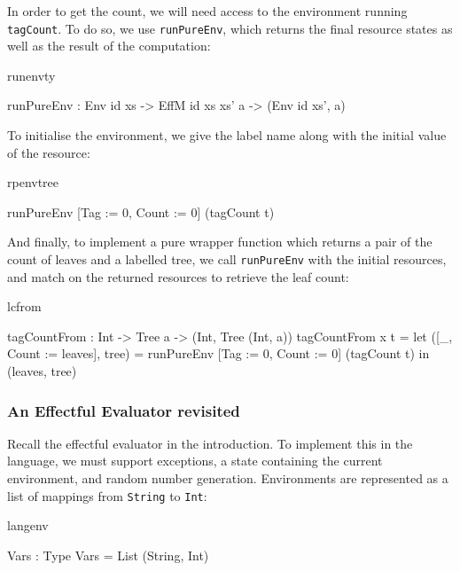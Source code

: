 

\noindent
In order to get the count, we will need access to the environment 
running \texttt{tagCount}. To do so, we use \texttt{runPureEnv}, which returns
the final resource states as well as the result of the computation:

\begin{SaveVerbatim}{runenvty}

runPureEnv : Env id xs -> 
             EffM id xs xs' a -> (Env id xs', a)

\end{SaveVerbatim}

\noindent
To initialise the environment, we give the label name along with the initial
value of the resource:

\begin{SaveVerbatim}{rpenvtree}

runPureEnv [Tag := 0, Count := 0] (tagCount t) 

\end{SaveVerbatim}

\noindent
And finally, to implement a pure wrapper function which returns a pair of the
count of leaves and a labelled tree, we call \texttt{runPureEnv} with the
initial resources, and match on the returned resources to retrieve the leaf
count:

\begin{SaveVerbatim}{lcfrom}

tagCountFrom : Int -> Tree a -> (Int, Tree (Int, a))
tagCountFrom x t 
    = let ([_, Count := leaves], tree) =
       runPureEnv [Tag := 0, Count := 0] (tagCount t)
          in (leaves, tree)

\end{SaveVerbatim}

\subsubsection{An Effectful Evaluator revisited}

Recall the effectful evaluator in the introduction. To implement this
in the \Eff{} language, we must support exceptions, a state containing the
current environment, and random number generation. Environments are
represented as a list of mappings from \texttt{String} to \texttt{Int}:

\begin{SaveVerbatim}{langenv}

Vars : Type
Vars = List (String, Int)

\end{SaveVerbatim}

